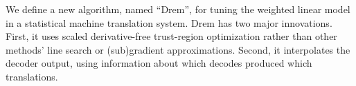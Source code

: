 We define a new algorithm, named ``Drem'', for tuning the weighted linear model in a statistical machine translation system. Drem has two major innovations. First, it uses scaled derivative-free trust-region optimization rather than other methods' line search or (sub)gradient approximations. Second, it interpolates the decoder output, using information about which decodes produced which translations.
